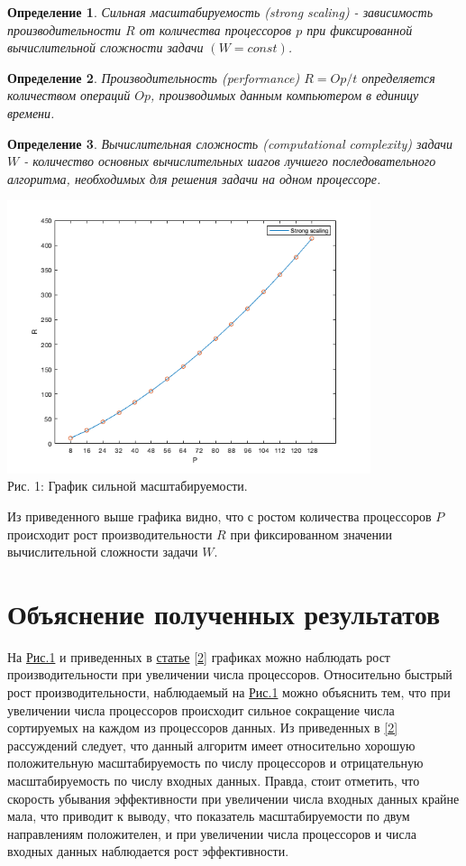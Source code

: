 \documentclass[a4paper, 12pt]{article}
\newtheorem{myDef}{Определение}
\begin{document}
\begin{myDef}
Сильная масштабируемость (strong scaling) - зависимость производительности $R$ от количества процессоров $p$ при фиксированной вычислительной сложности задачи $(W=const)$.
\end{myDef}
\begin{myDef}
Производительность (performance) $R=Op/t$ определяется количеством операций $Op$, производимых данным компьютером в единицу времени.
\end{myDef}
\begin{myDef}
Вычислительная сложность (computational complexity) задачи $W$ - количество основных вычислительных шагов лучшего последовательного алгоритма, необходимых для решения задачи на одном процессоре.
 \end{myDef}
 
\begin{center}
\includegraphics[width=0.8\textwidth]{str_sc.png}\\
Рис. 1: График сильной масштабируемости. \label{pic_1}
\end{center}
Из приведенного выше графика видно, что с ростом количества процессоров  $P$ происходит рост производительности $R$ при фиксированном значении вычислительной сложности задачи $W$.

\section{Объяснение полученных результатов}
На \hyperref[pic_1]{Рис.1} и приведенных в \href{https://algowiki-project.org/ru/Участник:Ashabokov\_415/Алгоритм\_быстрой\_сортировки}{статье} \hyperref[stat_1]{[2]} графиках можно наблюдать рост производительности при увеличении числа процессоров. Относительно быстрый рост производительности, наблюдаемый на \hyperref[pic_1]{Рис.1} можно объяснить тем, что при увеличении числа процессоров происходит сильное сокращение числа сортируемых на каждом из процессоров данных. Из приведенных в \hyperref[stat_1]{[2]} рассуждений следует, что данный алгоритм имеет относительно хорошую положительную масштабируемость по числу процессоров и отрицательную масштабируемость по числу входных данных. Правда, стоит отметить, что скорость убывания эффективности при увеличении числа входных данных крайне мала, что приводит к выводу, что показатель масштабируемости по двум направлениям положителен, и при увеличении числа процессоров и числа входных данных наблюдается рост эффективности. 
\end{document}
